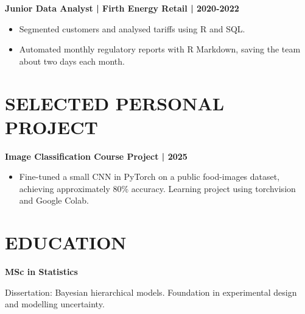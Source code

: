 \documentclass[11pt,a4paper]{article}
\newcommand{\cvsection}[1]{\section*{#1}}
\begin{document}
\textbf{Junior Data Analyst | Firth Energy Retail | 2020-2022}
\begin{itemize}
\item Segmented customers and analysed tariffs using R and SQL.
\item Automated monthly regulatory reports with R Markdown, saving the team about two days each month.
\end{itemize}
\cvsection{SELECTED PERSONAL PROJECT}
\textbf{Image Classification Course Project | 2025}
\begin{itemize}
\item Fine-tuned a small CNN in PyTorch on a public food-images dataset, achieving approximately 80\% accuracy. Learning project using torchvision and Google Colab.
\end{itemize}
\cvsection{EDUCATION}
\textbf{MSc in Statistics}\par
Dissertation: Bayesian hierarchical models. Foundation in experimental design and modelling uncertainty.
\end{document}
